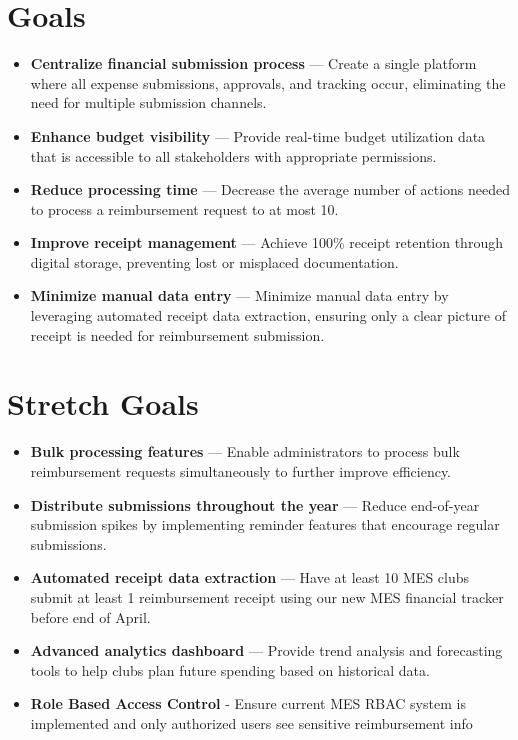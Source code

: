 \documentclass{article}
\begin{document}
\section{Goals}
\begin{itemize}
  \item \textbf{Centralize financial submission process} — Create a single platform where all expense submissions, approvals, and tracking occur, eliminating the need for multiple submission channels.

  \item \textbf{Enhance budget visibility} — Provide real-time budget utilization data that is accessible to all stakeholders with appropriate permissions.

  \item \textbf{Reduce processing time} — Decrease the average number of actions needed to process a reimbursement request to at most 10.

  \item \textbf{Improve receipt management} — Achieve 100\% receipt retention through digital storage, preventing lost or misplaced documentation.

  \item \textbf{Minimize manual data entry} — Minimize manual data entry by leveraging automated receipt data extraction, ensuring only a clear picture of receipt is needed for reimbursement submission. 
\end{itemize}

\section{Stretch Goals}
\begin{itemize}
  \item \textbf{Bulk processing features} — Enable administrators to process bulk reimbursement requests simultaneously to further improve efficiency.

  \item \textbf{Distribute submissions throughout the year} — Reduce end-of-year submission spikes by implementing reminder features that encourage regular submissions.

  \item \textbf{Automated receipt data extraction} — Have at least 10 MES clubs submit at least 1 reimbursement receipt using our new MES financial tracker before end of April.

  \item \textbf{Advanced analytics dashboard} — Provide trend analysis and forecasting tools to help clubs plan future spending based on historical data.
  
  \item \textbf{Role Based Access Control} - Ensure current MES RBAC system is implemented and only authorized users see sensitive reimbursement info
\end{itemize}
\end{document}
